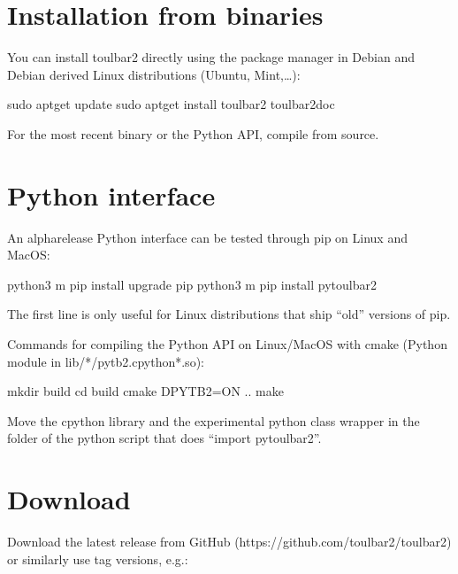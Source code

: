\documentclass[letterpaper,10pt,openany,oneside,english]{sphinxmanual}
\begin{document}
\section{Installation from binaries}
\label{\detokenize{_files/README:installation-from-binaries}}\label{\detokenize{_files/README:readme-2}}
\sphinxAtStartPar
You can install toulbar2 directly using the package manager in Debian
and Debian derived Linux distributions (Ubuntu, Mint,…):

\begin{sphinxVerbatim}[commandchars=\\\{\}]
sudo apt\PYGZhy{}get update
sudo apt\PYGZhy{}get install toulbar2 toulbar2\PYGZhy{}doc
\end{sphinxVerbatim}

\sphinxAtStartPar
For the most recent binary or the Python API, compile from source.


\section{Python interface}
\label{\detokenize{_files/README:python-interface}}\label{\detokenize{_files/README:readme-3}}
\sphinxAtStartPar
An alpha\sphinxhyphen{}release Python interface can be tested through pip on Linux and MacOS:

\begin{sphinxVerbatim}[commandchars=\\\{\}]
python3 \PYGZhy{}m pip install \PYGZhy{}\PYGZhy{}upgrade pip
python3 \PYGZhy{}m pip install pytoulbar2
\end{sphinxVerbatim}

\sphinxAtStartPar
The first line is only useful for Linux distributions that ship “old” versions of pip.

\sphinxAtStartPar
Commands for compiling the Python API on Linux/MacOS with cmake (Python module in lib/*/pytb2.cpython*.so):

\begin{sphinxVerbatim}[commandchars=\\\{\}]
mkdir build
cd build
cmake \PYGZhy{}DPYTB2=ON ..
make
\end{sphinxVerbatim}

\sphinxAtStartPar
Move the cpython library and the experimental  python class wrapper in the folder of the python script that does “import pytoulbar2”.


\section{Download}
\label{\detokenize{_files/README:download}}\label{\detokenize{_files/README:readme-4}}
\sphinxAtStartPar
Download the latest release from GitHub
(https://github.com/toulbar2/toulbar2) or similarly use tag versions,
e.g.:
\end{document}
